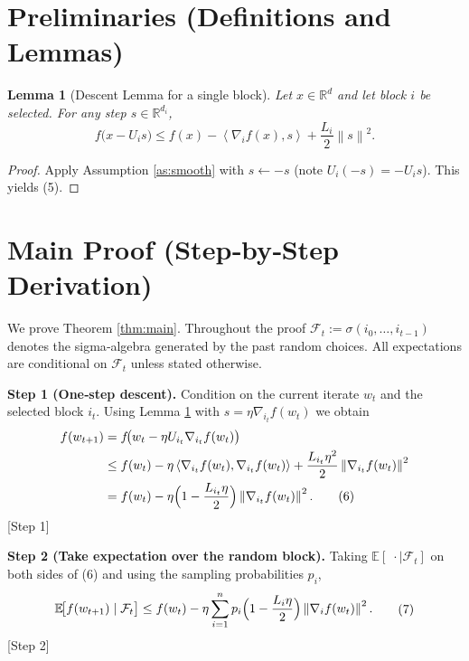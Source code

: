 \documentclass[11pt]{article}
\newtheorem{lemma}{Lemma}
\newcommand{\E}{\mathbb{E}}
\newcommand{\R}{\mathbb{R}}
\newcommand{\norm}[1]{\left\|#1\right\|}
\newcommand{\inner}[2]{\left\langle #1,#2 \right\rangle}
\begin{document}
\newpage
\section*{Preliminaries (Definitions and Lemmas)}
\begin{lemma}[Descent Lemma for a single block]\label{lem:descent}
Let $x\in\R^{d}$ and let block $i$ be selected. For any step $s\in\R^{d_i}$,
\[
f\bigl(x-U_i s\bigr)\le f(x)-\inner{\nabla_i f(x)}{s}+\frac{L_i}{2}\norm{s}^2 .
\tag{5}
\]
\end{lemma}
\begin{proof}
Apply Assumption \ref{as:smooth} with $s\gets -s$ (note $U_i(-s)= -U_i s$). This yields (5). \hfill\qedsymbol
\end{proof}

\section*{Main Proof (Step‑by‑Step Derivation)}
We prove Theorem \ref{thm:main}. Throughout the proof $ \mathcal{F}_t:=\sigma(i_0,\dots ,i_{t-1})$ denotes the sigma‑algebra generated by the past random choices. All expectations are conditional on $\mathcal{F}_t$ unless stated otherwise.

\bigskip
\noindent\textbf{Step 1 (One‑step descent).}  
Condition on the current iterate $w_t$ and the selected block $i_t$. Using Lemma \ref{lem:descent} with $s=\eta \nabla_{i_t} f(w_t)$ we obtain
\[
\begin{aligned}
f(w_{t+1})
&= f\!\bigl(w_t-\eta U_{i_t}\nabla_{i_t}f(w_t)\bigr)                                           \\
&\le f(w_t)-\eta\inner{\nabla_{i_t}f(w_t)}{\nabla_{i_t}f(w_t)}+\frac{L_{i_t}\eta^{2}}{2}
   \norm{\nabla_{i_t}f(w_t)}^{2}                           \\
&= f(w_t)-\eta\Bigl(1-\frac{L_{i_t}\eta}{2}\Bigr)\norm{\nabla_{i_t}f(w_t)}^{2}.
\tag{6}
\end{aligned}
\]
\hfill[Step 1]

\bigskip
\noindent\textbf{Step 2 (Take expectation over the random block).}  
Taking $\E[\;\cdot\mid\mathcal{F}_t]$ on both sides of (6) and using the sampling probabilities $p_i$,
\[
\begin{aligned}
\E\!\bigl[f(w_{t+1})\mid\mathcal{F}_t\bigr]
&\le f(w_t)-\eta\sum_{i=1}^{n}p_i\Bigl(1-\frac{L_i\eta}{2}\Bigr)
   \norm{\nabla_i f(w_t)}^{2}.                                            \\
\end{aligned}
\tag{7}
\]
\hfill[Step 2]
\end{document}
